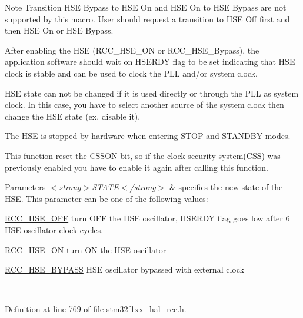 \begin{DoxyNote}{Note}
Transition H\+SE Bypass to H\+SE On and H\+SE On to H\+SE Bypass are not supported by this macro. User should request a transition to H\+SE Off first and then H\+SE On or H\+SE Bypass. 

After enabling the H\+SE (R\+C\+C\+\_\+\+H\+S\+E\+\_\+\+ON or R\+C\+C\+\_\+\+H\+S\+E\+\_\+\+Bypass), the application software should wait on H\+S\+E\+R\+DY flag to be set indicating that H\+SE clock is stable and can be used to clock the P\+LL and/or system clock. 

H\+SE state can not be changed if it is used directly or through the P\+LL as system clock. In this case, you have to select another source of the system clock then change the H\+SE state (ex. disable it). 

The H\+SE is stopped by hardware when entering S\+T\+OP and S\+T\+A\+N\+D\+BY modes. 

This function reset the C\+S\+S\+ON bit, so if the clock security system(\+C\+S\+S) was previously enabled you have to enable it again after calling this function. 
\end{DoxyNote}

\begin{DoxyParams}{Parameters}
{\em $<$strong$>$\+S\+T\+A\+T\+E$<$/strong$>$} & specifies the new state of the H\+SE. This parameter can be one of the following values\+: \begin{DoxyItemize}
\item \hyperlink{group___r_c_c___h_s_e___config_ga1616626d23fbce440398578855df6f97}{R\+C\+C\+\_\+\+H\+S\+E\+\_\+\+O\+FF} turn O\+FF the H\+SE oscillator, H\+S\+E\+R\+DY flag goes low after 6 H\+SE oscillator clock cycles. \item \hyperlink{group___r_c_c___h_s_e___config_gabc4f70a44776c557af20496b04d9a9db}{R\+C\+C\+\_\+\+H\+S\+E\+\_\+\+ON} turn ON the H\+SE oscillator \item \hyperlink{group___r_c_c___h_s_e___config_ga5ca515db2d5c4d5bdb9ee3d154df2704}{R\+C\+C\+\_\+\+H\+S\+E\+\_\+\+B\+Y\+P\+A\+SS} H\+SE oscillator bypassed with external clock \end{DoxyItemize}
\\
\hline
\end{DoxyParams}


Definition at line 769 of file stm32f1xx\+\_\+hal\+\_\+rcc.\+h.

